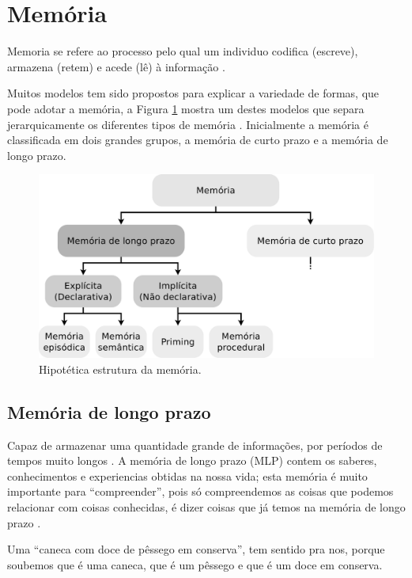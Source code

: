 \section{Memória}
\label{sec:memoria}

Memoria se refere ao processo pelo qual um individuo codifica (escreve), 
armazena (retem) e acede (lê) à informação
\cite[pp. 678]{spreen2006compendium} \cite[pp. 31]{de2000comprension}.

Muitos modelos tem sido propostos para explicar a variedade de formas, 
que pode adotar a memória, a Figura \ref{fig:memory-clasification}  mostra um destes modelos
que separa jerarquicamente os diferentes tipos de memória
\cite[pp. 678]{spreen2006compendium}.
Inicialmente a memória é classificada em dois grandes grupos,
a memória de curto prazo e a memória de longo prazo.
\begin{figure}[!h]
  \centering
    \includegraphics[width=\textwidth]{chapters/cap-learning/memory-clasification.eps} 
  \caption{Hipotética estrutura da memória.}
\label{fig:memory-clasification}
\end{figure}


\subsection{Memória de longo prazo} 
\label{sec:memoria:longo}
Capaz de armazenar uma quantidade grande de informações, 
por períodos de tempos muito longos \cite[pp. 158]{sternbergpsicologia}.
A memória de longo prazo (MLP) contem os saberes, conhecimentos e experiencias obtidas na nossa vida;
esta memória é muito importante para ``compreender'',
pois só compreendemos as coisas que podemos relacionar com coisas conhecidas,
é dizer coisas que já temos na memória de longo prazo \cite[pp. 34]{de2000comprension}.
\begin{example}
Uma ``caneca com doce de pêssego em conserva'', tem sentido pra nos,
porque soubemos que é uma caneca, que é um pêssego e que é um doce em conserva.
\end{example} 

